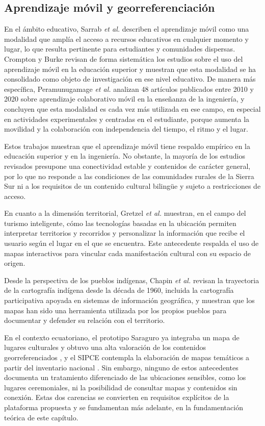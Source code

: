 \subsection{Aprendizaje móvil y georreferenciación}
En el ámbito educativo, Sarrab \textit{et al.} \cite{sarrab2012mobile} describen el aprendizaje móvil como una modalidad que amplía el acceso a recursos educativos en cualquier momento y lugar, lo que resulta pertinente para estudiantes y comunidades dispersas. Crompton y Burke \cite{crompton2018mobile} revisan de forma sistemática los estudios sobre el uso del aprendizaje móvil en la educación superior y muestran que esta modalidad se ha consolidado como objeto de investigación en ese nivel educativo. De manera más específica, Peramunugamage \textit{et al.} \cite{peramunugamage2023engineering} analizan 48 artículos publicados entre 2010 y 2020 sobre aprendizaje colaborativo móvil en la enseñanza de la ingeniería, y concluyen que esta modalidad es cada vez más utilizada en ese campo, en especial en actividades experimentales y centradas en el estudiante, porque aumenta la movilidad y la colaboración con independencia del tiempo, el ritmo y el lugar.

Estos trabajos muestran que el aprendizaje móvil tiene respaldo empírico en la educación superior y en la ingeniería. No obstante, la mayoría de los estudios revisados presupone una conectividad estable y contenidos de carácter general, por lo que no responde a las condiciones de las comunidades rurales de la Sierra Sur ni a los requisitos de un contenido cultural bilingüe y sujeto a restricciones de acceso.

En cuanto a la dimensión territorial, Gretzel \textit{et al.} \cite{gretzel2015smart} muestran, en el campo del turismo inteligente, cómo las tecnologías basadas en la ubicación permiten interpretar territorios y recorridos y personalizar la información que recibe el usuario según el lugar en el que se encuentra. Este antecedente respalda el uso de mapas interactivos para vincular cada manifestación cultural con su espacio de origen.

Desde la perspectiva de los pueblos indígenas, Chapin \textit{et al.} \cite{chapin2005mapping} revisan la trayectoria de la cartografía indígena desde la década de 1960, incluida la cartografía participativa apoyada en sistemas de información geográfica, y muestran que los mapas han sido una herramienta utilizada por los propios pueblos para documentar y defender su relación con el territorio.

En el contexto ecuatoriano, el prototipo Saraguro ya integraba un mapa de lugares culturales y obtuvo una alta valoración de los contenidos georreferenciados \cite{quezada2026mobile}, y el SIPCE contempla la elaboración de mapas temáticos a partir del inventario nacional \cite{inpc2026sipce}. Sin embargo, ninguno de estos antecedentes documenta un tratamiento diferenciado de las ubicaciones sensibles, como los lugares ceremoniales, ni la posibilidad de consultar mapas y contenidos sin conexión. Estas dos carencias se convierten en requisitos explícitos de la plataforma propuesta y se fundamentan más adelante, en la fundamentación teórica de este capítulo.

